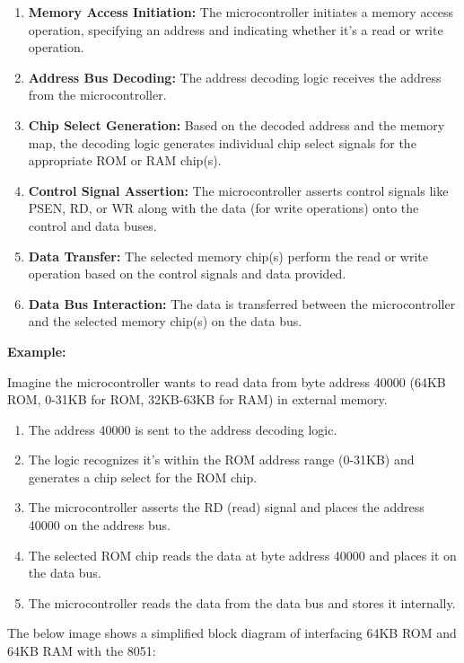 \documentclass[
]{article}
\begin{document}
\begin{enumerate}
\def\labelenumi{\arabic{enumi}.}
\item
  \textbf{Memory Access Initiation:} The microcontroller initiates a
  memory access operation, specifying an address and indicating whether
  it's a read or write operation.
\item
  \textbf{Address Bus Decoding:} The address decoding logic receives the
  address from the microcontroller.
\item
  \textbf{Chip Select Generation:} Based on the decoded address and the
  memory map, the decoding logic generates individual chip select
  signals for the appropriate ROM or RAM chip(s).
\item
  \textbf{Control Signal Assertion:} The microcontroller asserts control
  signals like PSEN, RD, or WR along with the data (for write
  operations) onto the control and data buses.
\item
  \textbf{Data Transfer:} The selected memory chip(s) perform the read
  or write operation based on the control signals and data provided.
\item
  \textbf{Data Bus Interaction:} The data is transferred between the
  microcontroller and the selected memory chip(s) on the data bus.
\end{enumerate}

\textbf{Example:}

Imagine the microcontroller wants to read data from byte address 40000
(64KB ROM, 0-31KB for ROM, 32KB-63KB for RAM) in external memory.

\begin{enumerate}
\def\labelenumi{\arabic{enumi}.}
\item
  The address 40000 is sent to the address decoding logic.
\item
  The logic recognizes it's within the ROM address range (0-31KB) and
  generates a chip select for the ROM chip.
\item
  The microcontroller asserts the RD (read) signal and places the
  address 40000 on the address bus.
\item
  The selected ROM chip reads the data at byte address 40000 and places
  it on the data bus.
\item
  The microcontroller reads the data from the data bus and stores it
  internally.
\end{enumerate}

The below image shows a simplified block diagram of interfacing 64KB ROM
and 64KB RAM with the 8051:
\end{document}
